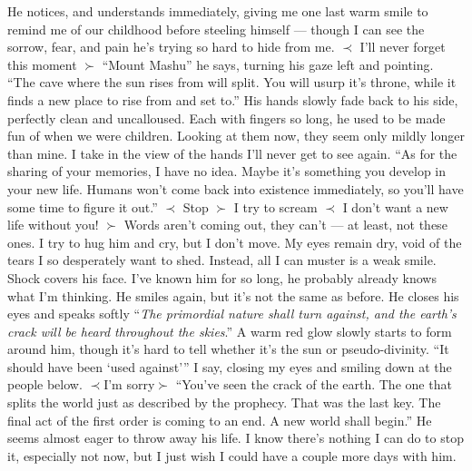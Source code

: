 \documentclass[openany, 12pt]{book}
\newcommand\tab[1][1cm]{\hspace*{#1}}
\begin{document}
\newline
\tab
He notices, and understands immediately, giving me one last warm smile to remind me of our childhood before steeling himself --- though I can see the sorrow, fear, and pain he's trying so hard to hide from me.
\newline
$\prec$ I'll never forget this moment $\succ$
\newline
\tab
``Mount Mashu'' he says, turning his gaze left and pointing. ``The cave where the sun rises from will split. You will usurp it's throne, while it finds a new place to rise from and set to.''
\newline
\tab
His hands slowly fade back to his side, perfectly clean and uncalloused. Each with fingers so long, he used to be made fun of when we were children. Looking at them now, they seem only mildly longer than mine. I take in the view of the hands I'll never get to see again.
\newline
\tab
``As for the sharing of your memories, I have no idea. Maybe it's something you develop in your new life. Humans won't come back into existence immediately, so you'll have some time to figure it out.''
\newline
$\prec$ Stop $\succ$
\newline
\tab
I try to scream
\newline
$\prec$ I don't want a new life without you! $\succ$
\newline
\tab
Words aren't coming out, they can't --- at least, not these ones. I try to hug him and cry, but I don't move. My eyes remain dry, void of the tears I so desperately want to shed. Instead, all I can muster is a weak smile.
\newline
\tab
Shock covers his face. I've known him for so long, he probably already knows what I'm thinking. He smiles again, but it's not the same as before.
\newline
\tab
He closes his eyes and speaks softly ``\textit{The primordial nature shall turn against, and the earth's crack will be heard throughout the skies}.'' A warm red glow slowly starts to form around him, though it's hard to tell whether it's the sun or pseudo-divinity.
\newline
\tab
``It should have been `used against''' I say, closing my eyes and smiling down at the people below.
\newline
$\prec$I'm sorry$\succ$
\newline
\tab
``You've seen the crack of the earth. The one that splits the world just as described by the prophecy. That was the last key. The final act of the first order is coming to an end. A new world shall begin.'' He seems almost eager to throw away his life. I know there's nothing I can do to stop it, especially not now, but I just wish I could have a couple more days with him.
\end{document}
